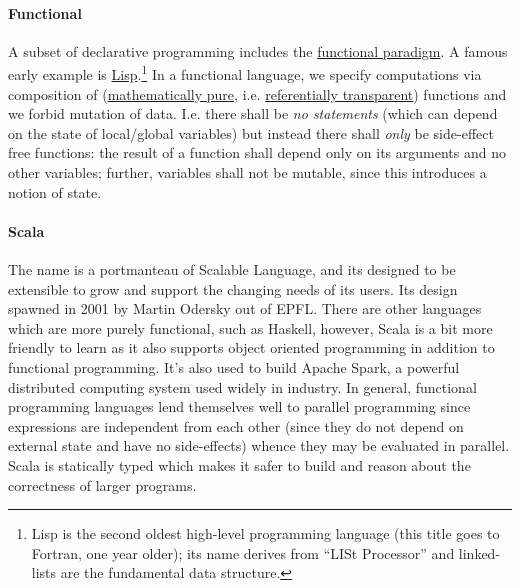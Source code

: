 \documentclass[12pt,letterpaper,twoside]{article}
\begin{document}
\paragraph{Functional} A subset
of declarative programming includes the 
\href{https://en.wikipedia.org/wiki/Functional_programming}{functional paradigm}.
A famous early example is 
\href{https://en.wikipedia.org/wiki/Lisp_(programming_language)}{Lisp}.\footnote{
  Lisp is the second oldest high-level programming language (this title goes to Fortran, 
  one year older); its name derives from ``LISt Processor'' and linked-lists are 
  the fundamental data structure.}
In a functional language, we specify computations via composition of 
(\href{https://en.wikipedia.org/wiki/Pure_function}{mathematically pure}, 
i.e. \href{https://en.wikipedia.org/wiki/Referential_transparency}{referentially transparent}) 
functions and we forbid mutation of data.
I.e. there shall be \emph{no statements} (which can depend on the
state of local/global variables) but instead there shall \emph{only} be side-effect
free functions: the result of a function shall depend only on its arguments
and no other variables; 
further, variables shall not be mutable, since this introduces a notion
of state.

\paragraph{Scala} The name is a portmanteau of Scalable Language, and its designed
to be extensible to grow and support the changing needs of its users. Its design
spawned in 2001 by Martin Odersky out of EPFL. There are other languages which are
more purely functional, such as Haskell, however, Scala is a bit more friendly to learn
as it also supports object oriented programming in addition to functional programming.
It's also used to build Apache Spark, a powerful distributed computing system used widely
in industry. In general, functional programming languages lend themselves well to
parallel programming since expressions are independent from each other (since they
do not depend on external state and have no side-effects) whence they may be evaluated
in parallel. Scala is statically typed which makes it safer to build and reason about 
the correctness of larger programs.
\end{document}
